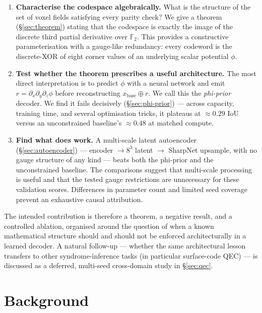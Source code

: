 \documentclass[11pt,a4paper]{article}
\begin{document}
\begin{enumerate}[nosep]
\item \textbf{Characterise the codespace algebraically.} What is the
structure of the set of voxel fields satisfying every parity check?
We give a theorem (\S\ref{sec:theorem}) stating that the codespace is
exactly the image of the discrete third partial derivative over
$\mathbb{F}_2$. This provides a constructive
parameterisation with a gauge-like redundancy: every codeword is the discrete-XOR of eight corner
values of an underlying scalar potential $\phi$.

\item \textbf{Test whether the theorem prescribes a useful
architecture.} The most direct interpretation is to predict $\phi$
with a neural network and emit $r = \partial_x \partial_y \partial_z
\phi$ before reconstructing $x_{\mathrm{base}}\oplus r$. We call this the \emph{phi-prior}
decoder. We find it fails decisively (\S\ref{sec:phi-prior}) ---
across capacity, training time, and several optimisation tricks, it
plateaus at $\approx 0.29$ IoU versus an unconstrained baseline's
$\approx 0.48$ at matched compute.

\item \textbf{Find what does work.} A multi-scale latent autoencoder
(\S\ref{sec:autoencoder}) --- encoder $\to 8^3$ latent $\to$ SharpNet
upsample, with no gauge structure of any kind --- beats both the
phi-prior and the unconstrained baseline. The comparisons suggest that multi-scale processing is useful and
that the tested gauge restrictions are unnecessary for these validation
scores. Differences in parameter count and limited seed coverage prevent
an exhaustive causal attribution.
\end{enumerate}

The intended contribution is therefore a theorem, a negative result,
and a controlled ablation, organised around the question of when a
known mathematical structure should and should not be enforced
architecturally in a learned decoder. A natural follow-up --- whether
the same architectural lesson transfers to other syndrome-inference tasks
(in particular surface-code QEC) --- is discussed as
a deferred, multi-seed cross-domain study in \S\ref{sec:qec}.

\section{Background}
\end{document}
